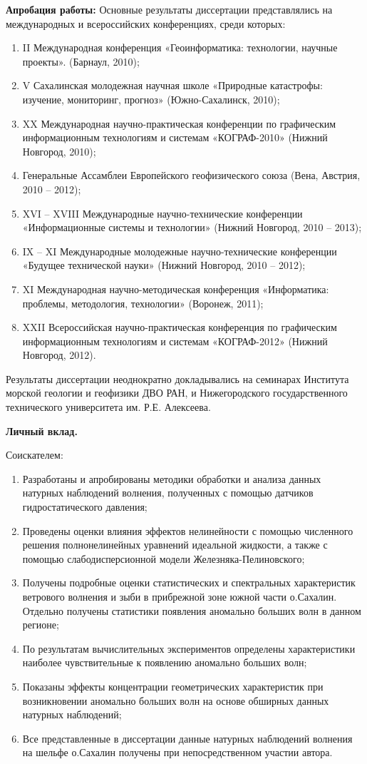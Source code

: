 \textbf{Апробация работы:}
Основные результаты диссертации представлялись на международных и всероссийских конференциях, среди которых:
\begin{enumerate}
  \item II Международная конференция «Геоинформатика: технологии, научные проекты». (Барнаул, 2010);
  \item V Сахалинская молодежная научная школе «Природные катастрофы: изучение, мониторинг, прогноз» (Южно-Сахалинск, 2010);
  \item XX Международная научно-практическая конференции по графическим информационным технологиям и системам «КОГРАФ-2010» (Нижний Новгород, 2010);
  \item Генеральные Ассамблеи Европейского геофизического союза (Вена, Австрия, 2010 – 2012);
  \item XVI – XVIII Международные научно-технические конференции «Информационные системы и технологии» (Нижний Новгород, 2010 – 2013);
  \item IX – XI Международные молодежные научно-технические конференции «Будущее технической науки» (Нижний Новгород, 2010 – 2012);
  \item XI Международная научно-методическая конференция «Информатика: проблемы, методология, технологии» (Воронеж, 2011);
  \item XXII Всероссийская научно-практическая конференция по графическим информационным технологиям и системам «КОГРАФ-2012» (Нижний Новгород, 2012).
\end{enumerate}
	
Результаты диссертации неоднократно докладывались на семинарах Института морской геологии и геофизики ДВО РАН, и Нижегородского государственного технического университета им. Р.Е. Алексеева.


\textbf{Личный вклад.}

Соискателем:
\begin{enumerate}
  \item Разработаны и апробированы методики обработки и анализа данных натурных наблюдений волнения, полученных с помощью датчиков гидростатического давления;
  \item Проведены оценки влияния эффектов нелинейности с помощью численного решения полнонелинейных уравнений идеальной жидкости, а также с помощью слабодисперсионной модели Железняка-Пелиновского;
  \item Получены подробные оценки статистических и спектральных характеристик ветрового волнения и зыби в прибрежной зоне южной части о.Сахалин. Отдельно получены статистики появления аномально больших волн в данном регионе;
  \item По результатам вычислительных экспериментов определены характеристики наиболее чувствительные к появлению аномально больших волн;
  \item Показаны эффекты концентрации геометрических характеристик при возникновении аномально больших волн на основе обширных данных натурных наблюдений;
  \item Все представленные в диссертации данные натурных наблюдений волнения на шельфе о.Сахалин получены при непосредственном участии автора.
\end{enumerate}

